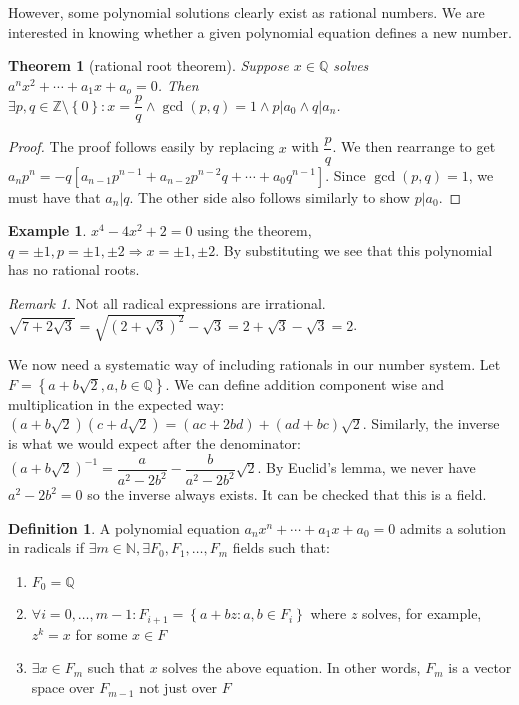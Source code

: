 \documentclass{article}
\newcommand\N{\ensuremath{\mathbb{N}}}
\newcommand\Z{\ensuremath{\mathbb{Z}}}
\newcommand\Q{\ensuremath{\mathbb{Q}}}
\newtheorem{theorem}{Theorem}[section]
\theoremstyle{definition}
\newtheorem{definition}{Definition}[subsection]
\newtheorem{eg}{Example}[subsection]
\theoremstyle{remark}
\newtheorem*{remark}{Remark}
\theoremstyle{plain}
\begin{document}
However, some polynomial solutions clearly exist as rational numbers. We are interested in knowing whether a given polynomial equation defines
a new number. 

\begin{theorem}[rational root theorem]
    Suppose \(x \in \Q\) solves \(a^nx^2 + \cdots + a_1x + a_o = 0\). Then \(\exists p,q \in \Z\setminus\left\{ 0 \right\}: x = \dfrac{p}{q} \land
    \gcd(p,q) = 1 \land p|a_0 \land q|a_n\).
\end{theorem}

\begin{proof}
    The proof follows easily by replacing \(x\) with \(\dfrac{p}{q}\). We then rearrange to get \(a_np^n = -q[a_{n-1}p^{n-1} + a_{n-2}p^{n-2}q + \cdots + a_0q^{n-1}]\). 
    Since \(\gcd(p,q) = 1\), we must have that \(a_n | q\). The other side also follows similarly to show \(p|a_0\).
\end{proof}

\begin{eg}
    \(x^4 - 4x^2 + 2 = 0\) using the theorem, \(q = \pm 1, p = \pm 1, \pm 2 \Rightarrow x = \pm 1, \pm 2\). By substituting we see that 
    this polynomial has no rational roots. 
\end{eg}

\begin{remark}
    Not all radical expressions are irrational. \(\sqrt{7 + 2\sqrt{3}} = \sqrt{(2 + \sqrt{3})^2} - \sqrt{3} = 2 + \sqrt{3} - \sqrt{3} = 2\).
\end{remark}

We now need a systematic way of including rationals in our number system. Let 
\(F = \left\{ a + b\sqrt{2}, a,b \in \Q \right\}\). We can define addition component wise and multiplication
in the expected way: \((a+b\sqrt{2})(c + d\sqrt{2}) = (ac + 2bd) + (ad + bc)\sqrt{2}\). Similarly, the inverse
is what we would expect after  the denominator: \((a + b\sqrt{2})^{-1} = \dfrac{a}{a^2 - 2b^2} - \dfrac{b}{a^2 - 2b^2}\sqrt{2}\). 
By Euclid's lemma, we never have \(a^2 - 2b^2 = 0\) so the inverse always exists.  It can be checked that this is a field. 


\begin{definition}
    A polynomial equation \(a_nx^n + \cdots + a_1x + a_0 = 0\) admits a solution in radicals if \(\exists m \in \N, \exists F_0, F_1, \ldots, F_m\)
    fields such that: 
    \begin{enumerate}
        \item \(F_0 = \Q\)
        \item \(\forall i = 0, \ldots, m-1: F_{i+1} = \left\{ a + bz: a,b \in F_i \right\}\) where \(z\) solves, for example, \(z^k = x\) for some \(x \in F\)
        \item \(\exists x \in F_m\) such that \(x\) solves the above equation. In other words, \(F_m\) is a vector space over \(F_{m-1}\) not just over \(F\)
    \end{enumerate}
\end{definition}
\end{document}
